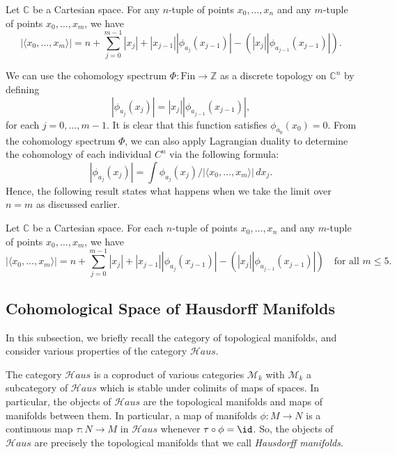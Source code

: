 \documentclass[a4paper,reqno,oneside]{article}
\begin{document}
\begin{theorem}\label{thm:coho2}
Let $\mathbb C$ be a Cartesian space. For any $n$-tuple of points $x_0,\dots,x_n$ and any $m$-tuple of points $x_0,\dots,x_m$, we have
\[
|\langle x_0,\dots,x_m\rangle|=n+\sum_{j=0}^{m-1}|x_j|+|x_{j-1}||\phi_{a_j}(x_{j-1})|-(|x_{j}||\phi_{a_{j-1}}(x_{j-1})|).
\]
\end{theorem}

We can use the cohomology spectrum $\Phi:\text{Fin}\to \mathbb Z$ as a discrete topology on $\mathbb C^n$ by defining 
\[
|\phi_{a_j}(x_j)|=|x_{j}||\phi_{a_{j-1}}(x_{j-1})|,
\]
for each $j=0,\dots,m-1$. It is clear that this function satisfies $\phi_{a_0}(x_0)=0$. From the cohomology spectrum $\Phi$, we can also apply Lagrangian duality to determine the cohomology of each individual $C^{n}$ via the following formula:
\[
|\phi_{a_j}(x_j)|=\int \phi_{a_j}(x_j)/|\langle x_0,\dots,x_m\rangle|\,dx_j.
\]
Hence, the following result states what happens when we take the limit over $n=m$ as discussed earlier.

\begin{theorem}\label{thm:coho3}
Let $\mathbb C$ be a Cartesian space. For each $n$-tuple of points $x_0,\dots,x_n$ and any $m$-tuple of points $x_0,\dots,x_m$, we have
\[
|\langle x_0,\dots,x_m\rangle|=n+\sum_{j=0}^{m-1}|x_j|+|x_{j-1}||\phi_{a_j}(x_{j-1})|-(|x_{j}||\phi_{a_{j-1}}(x_{j-1})|) \quad \text{for all $m\leq 5$}.
\]
\end{theorem}



\subsection{Cohomological Space of Hausdorff Manifolds} \label{subsec:haus}

In this subsection, we briefly recall the category of topological manifolds, and consider various properties of the category $\mathcal{H}aus$. 

The category $\mathcal{H}aus$ is a coproduct of various categories $\mathcal{M}_k$ with $\mathcal{M}_k$ a subcategory of $\mathcal{H}aus$ which is stable under colimits of maps of spaces. In particular, the objects of $\mathcal{H}aus$ are the topological manifolds and maps of manifolds between them. In particular, a map of manifolds $\phi\colon M\to N$ is a continuous map $\tau\colon N\to M$ in $\mathcal{H}aus$ whenever $\tau\circ\phi=\id$. So, the objects of $\mathcal{H}aus$ are precisely the topological manifolds that we call \emph{Hausdorff manifolds}. 
\end{document}
